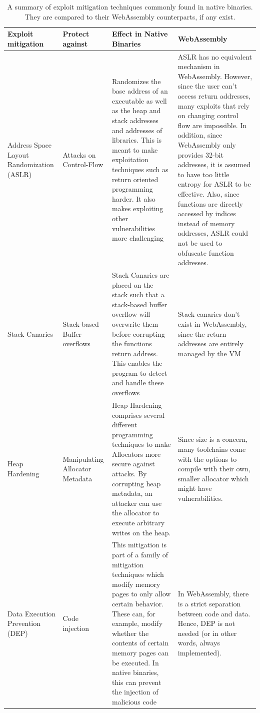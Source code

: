 \documentclass[sigconf]{acmart}
\begin{document}
\begin{table}
\begin{tabular}{p{2cm} | p{2cm} | p{6cm} | p{6cm} }
  \toprule
  Exploit mitigation & Protect against & Effect in Native Binaries & WebAssembly \\
  \midrule
  Address Space Layout Randomization (ASLR) & Attacks on Control-Flow & Randomizes the base address of an executable as well as the heap and stack addresses and addresses of libraries. This is meant to make exploitation techniques such as return oriented programming harder. It also makes exploiting other vulnerabilities more challenging& ASLR has no equivalent mechanism in WebAssembly. However, since the user can't access return addresses, many exploits that rely on changing control flow are impossible. In addition, since WebAssembly only provides 32-bit addresses, it is assumed to have too little entropy for ASLR to be effective. Also, since functions are directly accessed by indices instead of memory addresses, ASLR could not be used to obfuscate function addresses. \\ \hline
   Stack Canaries & Stack-based Buffer overflows & Stack Canaries are placed on the stack such that a stack-based buffer overflow will overwrite them before corrupting the functions return address. This enables the program to detect and handle these overflows & Stack canaries don't exist in WebAssembly, since the return addresses are entirely managed by the VM \\ \hline
   Heap Hardening & Manipulating Allocator Metadata & Heap Hardening comprises several different programming techniques to make Allocators more secure against attacks. By corrupting heap metadata, an attacker can use the allocator to execute arbitrary writes on the heap. & Since size is a concern, many toolchains come with the options to compile with their own, smaller allocator which might have vulnerabilities.\\ \hline
   Data Execution Prevention (DEP) & Code injection & This mitigation is part of a family of mitigation techniques which modify memory pages to only allow certain behavior. These can, for example, modify whether the contents of certain memory pages can be executed. In native binaries, this can prevent the injection of malicious code & In WebAssembly, there is a strict separation between code and data. Hence, DEP is not needed (or in other words, always implemented).
\end{tabular}
\label{table:exploit_mitigation_wasm}
\caption{A summary of exploit mitigation techniques commonly found in native binaries. They are compared to their WebAssembly counterparts, if any exist.}
\end{table}
\end{document}
